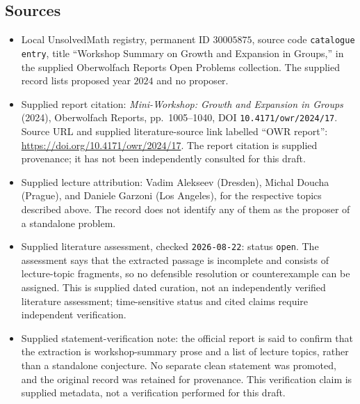 \documentclass[11pt]{article}
\begin{document}
\subsection{Sources}
\begin{itemize}
\item Local UnsolvedMath registry, permanent ID \(30005875\), source code \texttt{catalogue entry}, title ``Workshop Summary on Growth and Expansion in Groups,'' in the supplied Oberwolfach Reports Open Problems collection. The supplied record lists proposed year \(2024\) and no proposer.
\item Supplied report citation: \emph{Mini-Workshop: Growth and Expansion in Groups} (2024), Oberwolfach Reports, pp.\ 1005--1040, DOI \texttt{10.4171/owr/2024/17}. Source URL and supplied literature-source link labelled ``OWR report'': \url{https://doi.org/10.4171/owr/2024/17}. The report citation is supplied provenance; it has not been independently consulted for this draft.
\item Supplied lecture attribution: Vadim Alekseev (Dresden), Michal Doucha (Prague), and Daniele Garzoni (Los Angeles), for the respective topics described above. The record does not identify any of them as the proposer of a standalone problem.
\item Supplied literature assessment, checked \texttt{2026-08-22}: status \texttt{open}. The assessment says that the extracted passage is incomplete and consists of lecture-topic fragments, so no defensible resolution or counterexample can be assigned. This is supplied dated curation, not an independently verified literature assessment; time-sensitive status and cited claims require independent verification.
\item Supplied statement-verification note: the official report is said to confirm that the extraction is workshop-summary prose and a list of lecture topics, rather than a standalone conjecture. No separate clean statement was promoted, and the original record was retained for provenance. This verification claim is supplied metadata, not a verification performed for this draft.
\end{itemize}
\end{document}
